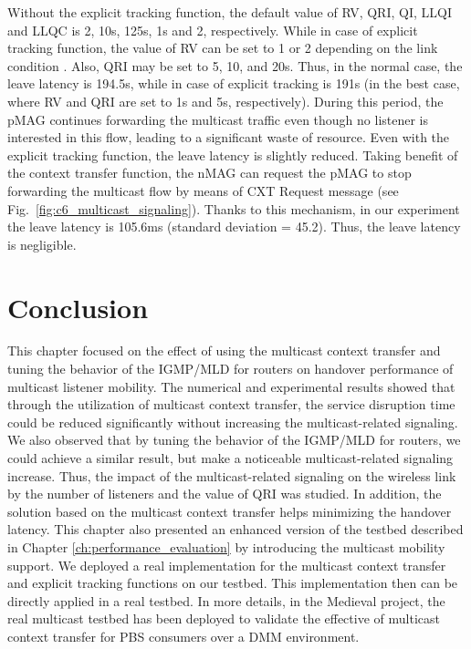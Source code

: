 Without the explicit tracking function, the default value of RV, QRI, QI, LLQI and LLQC is 2, 10s, 125s, 1s and 2, respectively.  While in case of explicit tracking function, the value of RV can be set to 1 or 2 depending on the link condition \cite{tuning_MLD}. Also, QRI may be set to 5, 10, and 20s. Thus, in the normal case, the leave latency is 194.5s, while in case of explicit tracking is 191s (in the best case, where RV and QRI are set to 1s and 5s, respectively). During this period, the pMAG continues forwarding the multicast traffic even though no listener is interested in this flow, leading to a significant waste of resource. Even with the explicit tracking function, the leave latency is slightly reduced. Taking benefit of the context transfer function, the nMAG can request the pMAG to stop forwarding the multicast flow by means of CXT Request message (see Fig.~\ref{fig:c6_multicast_signaling}). Thanks to this mechanism, in our experiment the leave latency is 105.6ms (standard deviation = 45.2). Thus, the leave latency is negligible.   

\section{Conclusion} \label{section:conclusion}
This chapter focused on the effect of using the multicast context transfer and tuning the behavior of the IGMP/MLD for routers on handover performance of multicast listener mobility. The numerical and experimental results showed that through the utilization of multicast context transfer, the service disruption time could be reduced significantly without increasing the multicast-related signaling. We also observed that by tuning the behavior of the IGMP/MLD for routers, we could achieve a similar result, but make a noticeable multicast-related signaling increase. Thus, the impact of the multicast-related signaling on the wireless link by the number of listeners and the value of QRI was studied. In addition, the solution based on the multicast context transfer helps minimizing the handover latency. This chapter also presented an enhanced version of the testbed described in Chapter \ref{ch:performance_evaluation} by introducing the multicast mobility support. We deployed a real implementation for the multicast context transfer and explicit tracking functions on our testbed. This implementation then can be directly applied in a real testbed. In more details, in the Medieval project, the real multicast testbed \cite{d4.3, d4.4} has been deployed to validate the effective of multicast context transfer for PBS consumers over a DMM environment.   
